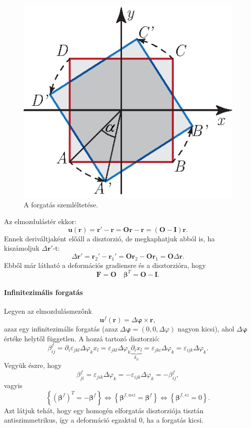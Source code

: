 \documentclass[12pt,a4paper]{scrartcl}
\let\mathbf\bm
\begin{document}
\begin{figure}[htb] 
\centering    
\includegraphics[scale=1]{figs/forgatas.eps}
\caption{A forgatás szemléltetése.}
\label{fig:forgat}
\end{figure}

Az elmozdulástér ekkor:
\[{\mathbf{u}}\left( {\mathbf{r}} \right) = {\mathbf{r}}' - {\mathbf{r}} = {\mathbf{Or}} - {\mathbf{r}} = \left( {{\mathbf{O}} - {\mathbf{I}}} \right){\mathbf{r}}.\]
Ennek deriváltjaként előáll a disztorzió, de megkaphatjuk abból is, ha kiszámoljuk $\Delta {\mathbf{r}}'$-t:
\[\Delta {\mathbf{r}}' = {{\mathbf{r}}_2}' - {{\mathbf{r}}_1}' = {\mathbf{O}}{{\mathbf{r}}_2} - {\mathbf{O}}{{\mathbf{r}}_1} = {\mathbf{O}}\Delta {\mathbf{r}}.\]
Ebből már látható a deformációs gradiensre és a disztorzióra, hogy 
\[{\mathbf{F}} = {\mathbf{O}}\quad {{\mathbf{\beta }}^T} = {\mathbf{O}} - {\mathbf{I}}.\]
\paragraph{Infinitezimális forgatás}
Legyen az elmozdulásmezőnk
\begin{equation} \label{eq:inf_forgat}
{{\mathbf{u}}^f}\left( {\mathbf{r}} \right) = \Delta {\mathbf{\varphi }} \times {\mathbf{r}},
\end{equation}
azaz egy infinitezimális forgatás (azaz $\Delta {\mathbf{\varphi }} = \left( {0,0,\Delta \varphi } \right)$ nagyon kicsi), ahol $\Delta {\mathbf{\varphi }}$ értéke helytől független. A hozzá tartozó disztorzió:
\[\beta _{ij}^f = {\partial _i}{\varepsilon _{jkl}}\Delta {\varphi _k}{x_l} = {\varepsilon _{jkl}}\Delta {\varphi _k}\underbrace {{\partial _i}{x_l}}_{{\delta _{il}}} = {\varepsilon _{jki}}\Delta {\varphi _k} = {\varepsilon _{ijk}}\Delta {\varphi _k}.\]
Vegyük észre, hogy 
\[\beta _{ji}^f = {\varepsilon _{jik}}\Delta {\varphi _k} =  - {\varepsilon _{ijk}}\Delta {\varphi _k} =  - \beta _{ij}^f,\]
vagyis
\[\left\{ {{{\left( {{{\mathbf{\beta }}^f}} \right)}^T} =  - {{\mathbf{\beta }}^f}} \right\} \Leftrightarrow \left\{ {{{\mathbf{\beta }}^{f,asz}} = {{\mathbf{\beta }}^f}} \right\} \Leftrightarrow \left\{ {{{\mathbf{\beta }}^{f,sz}} = 0} \right\}.\]
Azt látjuk tehát, hogy egy homogén elforgatás disztorziója tisztán antiszimmetrikus, így a deformáció egzaktul 0, ha a forgatás kicsi. 
\end{document}
